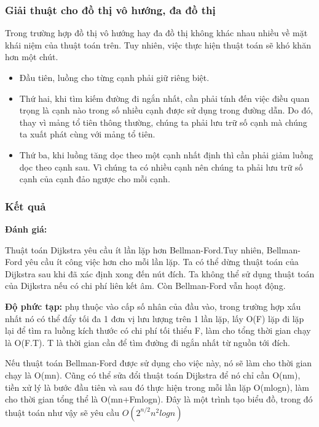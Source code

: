 \documentclass[a4paper]{article}
\begin{document}
    \subsubsection{Giải thuật cho đồ thị vô hướng, đa đồ thị}

    Trong trường hợp đồ thị vô hướng hay đa đồ thị không khác nhau nhiều về mặt khái niệm của thuật toán trên. 
    Tuy nhiên, việc thực hiện thuật toán sẽ khó khăn hơn một chút.
    \begin{itemize}
        \item Đầu tiên, luồng cho từng cạnh phải giữ riêng biệt.
        \item Thứ hai, khi tìm kiếm đường đi ngắn nhất, cần phải tính đến việc điều quan trọng là cạnh nào trong số nhiều cạnh được sử dụng trong đường dẫn. 
            Do đó, thay vì mảng tổ tiên thông thường, chúng ta phải lưu trữ số cạnh mà chúng ta xuất phát cùng với mảng tổ tiên.
        \item Thứ ba, khi luồng tăng dọc theo một cạnh nhất định thì cần phải giảm luồng dọc theo cạnh sau. Vì chúng ta có nhiều cạnh nên chúng ta phải lưu trữ số cạnh của cạnh đảo ngược cho mỗi cạnh.
    \end{itemize}

    \subsubsection{Kết quả}

    \textbf{Đánh giá:}

    Thuật toán Dijkstra yêu cầu ít lần lặp hơn Bellman-Ford.Tuy nhiên, Bellman-Ford yêu cầu ít công việc hơn cho mỗi lần lặp.
    Ta có thể dừng thuật toán của Dijkstra sau khi đã xác định xong đến nút đích.
    Ta không thể sử dụng thuật toán của Dijkstra nếu có chi phí liên kết âm.
    Còn Bellman-Ford vẫn hoạt động.

    \textbf{Độ phức tạp:} phụ thuộc vào cấp số nhân của đầu vào, trong trường hợp xấu nhất nó có thể đẩy tối đa 1 đơn vị lưu lượng trên 1 lần lặp, 
    lấy O(F) lặp đi lặp lại để tìm ra luồng kích thước có chi phí tối thiểu F, 
    làm cho tổng thời gian chạy là O(F.T). T là thời gian cần để tìm đường đi ngắn nhất từ nguồn tới đích.

    Nếu thuật toán Bellman-Ford được sử dụng cho việc này, nó sẽ làm cho thời gian chạy là O(mn). 
    Cũng có thể sửa đổi thuật toán Dijkstra để nó chỉ cần O(nm), tiền xử lý là bước đầu tiên và sau đó thực hiện trong mỗi lần lặp O(mlogn), làm cho thời gian tổng thể là O(mn+Fmlogn). 
    Đây là một trình tạo biểu đồ, trong đó thuật toán như vậy sẽ yêu cầu $O(2^{n/2}n^2logn)$
\end{document}
